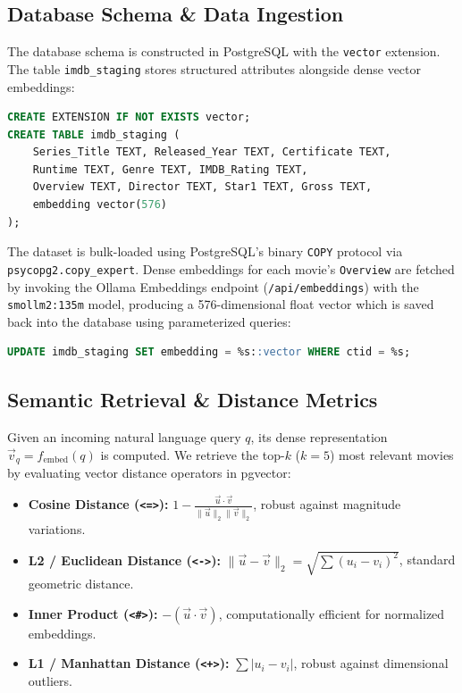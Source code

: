 \documentclass[11pt,a4paper]{article}
\begin{document}
\subsection{Database Schema \& Data Ingestion}
The database schema is constructed in PostgreSQL with the \texttt{vector} extension. The table \texttt{imdb\_staging} stores structured attributes alongside dense vector embeddings:
\begin{lstlisting}[language=SQL]
CREATE EXTENSION IF NOT EXISTS vector;
CREATE TABLE imdb_staging (
    Series_Title TEXT, Released_Year TEXT, Certificate TEXT,
    Runtime TEXT, Genre TEXT, IMDB_Rating TEXT,
    Overview TEXT, Director TEXT, Star1 TEXT, Gross TEXT,
    embedding vector(576)
);
\end{lstlisting}
The dataset is bulk-loaded using PostgreSQL's binary \texttt{COPY} protocol via \texttt{psycopg2.copy\_expert}. Dense embeddings for each movie's \texttt{Overview} are fetched by invoking the Ollama Embeddings endpoint (\texttt{/api/embeddings}) with the \texttt{smollm2:135m} model, producing a 576-dimensional float vector which is saved back into the database using parameterized queries:
\begin{lstlisting}[language=SQL]
UPDATE imdb_staging SET embedding = %s::vector WHERE ctid = %s;
\end{lstlisting}

\subsection{Semantic Retrieval \& Distance Metrics}
Given an incoming natural language query $q$, its dense representation $\vec{v}_q = f_{\text{embed}}(q)$ is computed. We retrieve the top-$k$ ($k=5$) most relevant movies by evaluating vector distance operators in pgvector:
\begin{itemize}
    \item \textbf{Cosine Distance (\texttt{<=>}):} $1 - \frac{\vec{u} \cdot \vec{v}}{\|\vec{u}\|_2 \|\vec{v}\|_2}$, robust against magnitude variations.
    \item \textbf{L2 / Euclidean Distance (\texttt{<->}):} $\|\vec{u} - \vec{v}\|_2 = \sqrt{\sum (u_i - v_i)^2}$, standard geometric distance.
    \item \textbf{Inner Product (\texttt{<\#>}):} $-(\vec{u} \cdot \vec{v})$, computationally efficient for normalized embeddings.
    \item \textbf{L1 / Manhattan Distance (\texttt{<+>}):} $\sum |u_i - v_i|$, robust against dimensional outliers.
\end{itemize}
\end{document}
